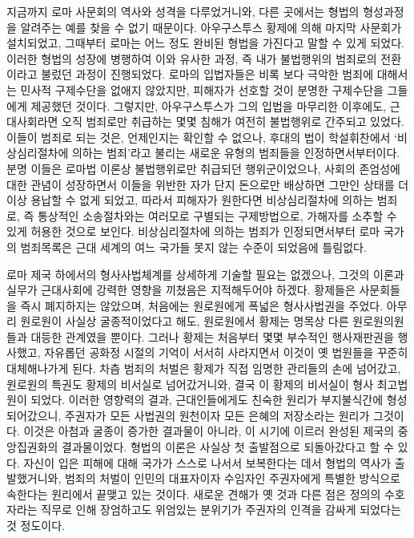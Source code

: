 지금까지 로마 사문회의 역사와 성격을 다루었거니와,
다른 곳에서는 형법의 형성과정을 알려주는 예를 찾을 수 없기 때문이다.
아우구스투스 황제에 의해
마지막 사문회가 설치되었고,
그때부터 로마는 어느 정도 완비된 형법을 가진다고 말할 수 있게 되었다.
이러한 형법의 성장에 병행하여
이와 유사한 과정, 즉
내가 불법행위의 범죄로의 전환이라고 불렀던 과정이 진행되었다.
로마의 입법자들은
비록 보다 극악한 범죄에 대해서는
민사적 구제수단을 없애지 않았지만,
피해자가 선호할 것이 분명한 구제수단을 그들에게 제공했던 것이다.
그렇지만,
아우구스투스가 그의 입법을 마무리한 이후에도,
근대사회라면 오직 범죄로만 취급하는
몇몇 침해가 여전히 불법행위로 간주되고 있었다.
이들이 범죄로 되는 것은,
언제인지는 확인할 수 없으나, 후대의
법이 학설휘찬에서
`비상심리절차에 의하는 범죄'라고
불리는 새로운 유형의 범죄들을 인정하면서부터이다.
분명
이들은
로마법 이론상 불법행위로만 취급되던 행위군이었으나,
사회의 존엄성에 대한 관념이 성장하면서
이들을 위반한 자가 단지 돈으로만 배상하면 그만인 상태를
더 이상 용납할 수 없게 되었고,
따라서 피해자가 원한다면
비상심리절차에 의하는 범죄로,
즉 통상적인 소송절차와는 여러모로 구별되는 구제방법으로,
가해자를 소추할 수 있게 허용한 것으로 보인다.
비상심리절차에 의하는 범죄가 인정되면서부터
로마 국가의 범죄목록은 근대 세계의 여느 국가들 못지 않는 수준이
되었음에 틀림없다.

로마 제국 하에서의 형사사법체계를
상세하게 기술할 필요는 없겠으나,
그것의 이론과 실무가 근대사회에 강력한 영향을 끼쳤음은
지적해두어야 하겠다.
황제들은
사문회들을 즉시 폐지하지는 않았으며,
처음에는
원로원에게
폭넓은 형사사법권을
주었다.
아무리
원로원이
사실상 굴종적이었다고 해도,
원로원에서 황제는
명목상
다른 원로원의원들과 대등한 관계였을 뿐이다.
그러나
황제는
처음부터
몇몇 부수적인 행사재판권을 행사했고,
자유롭던 공화정 시절의 기억이 서서히 사라지면서
이것이 옛 법원들을 꾸준히 대체해나가게 된다.
차츰
범죄의 처벌은
황제가 직접 임명한 관리들의 손에 넘어갔고,
원로원의 특권도 황제의 비서실로 넘어갔거니와,
결국 이 황제의 비서실이 형사 최고법원이 되었다.
이러한 영향력의 결과,
근대인들에게도 친숙한 원리가 부지불식간에 형성되어갔으니,
주권자가 모든 사법권의 원천이자 모든 은혜의 저장소라는 원리가 그것이다.
이것은 아첨과 굴종이 증가한 결과물이 아니라,
이 시기에 이르러 완성된 제국의 중앙집권화의 결과물이었다.
형법의 이론은 사실상 첫 출발점으로 되돌아갔다고 할 수 있다.
자신이 입은 피해에 대해 국가가 스스로 나서서 보복한다는 데서
형법의 역사가 출발했거니와,
범죄의 처벌이
인민의 대표자이자 수임자인 주권자에게
특별한 방식으로 속한다는 원리에서 끝맺고 있는 것이다.
새로운 견해가 옛 것과 다른 점은
정의의 수호자라는 직무로 인해
장엄하고도 위엄있는 분위기가
주권자의 인격을 감싸게 되었다는 것 정도이다.

